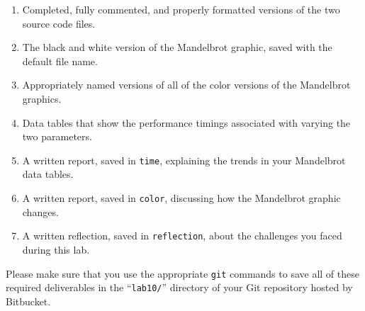 \vspace{-0.125in}
\begin{enumerate}
    \setlength{\itemsep}{0pt}

  \item Completed, fully commented, and properly formatted versions of the two source code files.
  \item The black and white version of the Mandelbrot graphic, saved with the default file name.
  \item Appropriately named versions of all of the color versions of the Mandelbrot graphics.
  \item Data tables that show the performance timings associated with varying the two parameters.
  \item A written report, saved in {\tt time}, explaining the trends in your Mandelbrot data tables.
  \item A written report, saved in {\tt color}, discussing how the Mandelbrot graphic changes.
  \item A written reflection, saved in {\tt reflection}, about the challenges you faced during this lab.

\end{enumerate}
\vspace{-0.1in}

Please make sure that you use the appropriate {\tt git} commands to save all of these required deliverables in the
``{\tt lab10/}'' directory of your Git repository hosted by Bitbucket.




